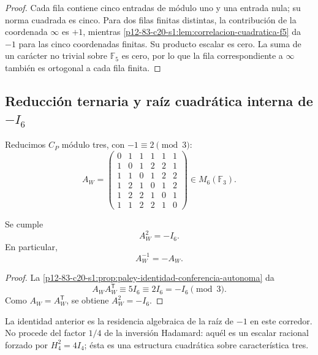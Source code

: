 \begin{proof}
Cada fila contiene cinco entradas de módulo uno y una entrada nula; su
norma cuadrada es cinco. Para dos filas finitas distintas, la contribución
de la coordenada \(\infty\) es \(+1\), mientras
\cref{p12-83-c20-s1:lem:correlacion-cuadratica-f5} da \(-1\) para las cinco coordenadas
finitas. Su producto escalar es cero. La suma de un carácter no trivial
sobre \(\mathbb F_5\) es cero, por lo que la fila correspondiente a
\(\infty\) también es ortogonal a cada fila finita.
\end{proof}

\subsection{Reducción ternaria y raíz cuadrática interna de \texorpdfstring{\(-I_6\)}{-I₆}}

Reducimos \(C_P\) módulo tres, con \(-1\equiv2\pmod3\):
\begin{equation}
 A_W=
 \begin{pmatrix}
 0&1&1&1&1&1\\
 1&0&1&2&2&1\\
 1&1&0&1&2&2\\
 1&2&1&0&1&2\\
 1&2&2&1&0&1\\
 1&1&2&2&1&0
 \end{pmatrix}
 \in M_6(\mathbb F_3).
 \label{p12-83-c20-s1:eq:matriz-paley-witt-ternaria}
\end{equation}

\begin{theorem}
\label{p12-83-c20-s1:thm:aw-cuadrado-menos-identidad-autonomo}
Se cumple
\begin{equation}
 \boxed{A_W^2=-I_6.}
 \label{p12-83-c20-s1:eq:aw-cuadrado-menos-identidad-autonomo}
\end{equation}
En particular,
\[
 A_W^{-1}=-A_W.
\]
\end{theorem}

\begin{proof}
La \cref{p12-83-c20-s1:prop:paley-identidad-conferencia-autonoma} da
\[
 A_WA_W^{\mathsf T}
 \equiv5I_6
 \equiv2I_6
 =-I_6
 \pmod3.
\]
Como \(A_W=A_W^{\mathsf T}\), se obtiene \(A_W^2=-I_6\).
\end{proof}

La identidad anterior es la residencia algebraica de la raíz de \(-1\)
en este corredor. No procede del factor \(1/4\) de la inversión Hadamard:
aquél es un escalar racional forzado por \(H_4^2=4I_4\); ésta es una
estructura cuadrática sobre característica tres.

